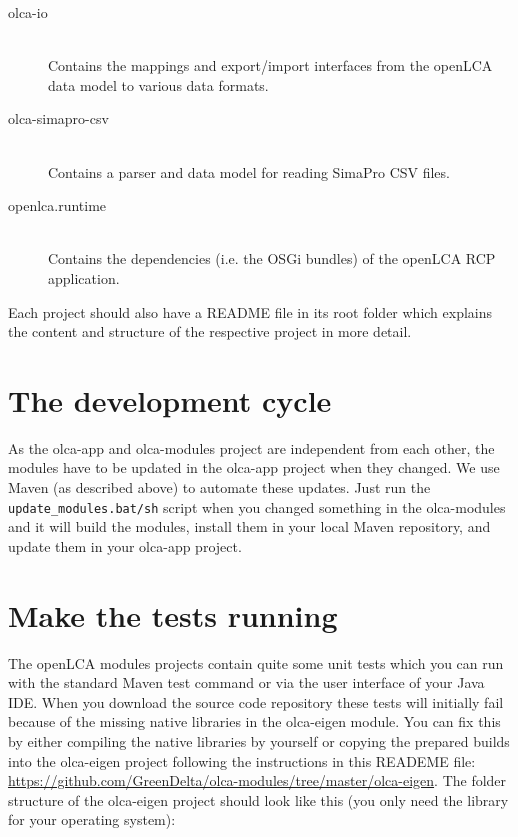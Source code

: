 \documentclass{scrreprt}
\begin{document}
\begin{description}
  \item[olca-io] \hfill \\
  Contains the mappings and export/import interfaces from the openLCA data model to various data formats.
  
  \item[olca-simapro-csv] \hfill \\
  Contains a parser and data model for reading SimaPro CSV files.
  
  \item[openlca.runtime] \hfill \\
  Contains the dependencies (i.e. the OSGi bundles) of the openLCA RCP application.
  
\end{description}

Each project should also have a README file in its root folder which explains the content and structure of the respective project in more detail.

\section{The development cycle}
As the olca-app and olca-modules project are independent from each other, the modules have to be updated in the olca-app project when they changed. We use Maven (as described above) to automate these updates. Just run the \texttt{update\_modules.bat/sh} script when you changed something in the olca-modules and it will build the modules, install them in your local Maven repository, and update them in your olca-app project. 

\section{Make the tests running}
The openLCA modules projects contain quite some unit tests which you can run with the standard Maven test command or via the user interface of your Java IDE. When you download the source code repository these tests will initially fail because of the missing native libraries in the olca-eigen module. You can fix this by either compiling the native libraries by yourself or copying the prepared builds into the olca-eigen project following the instructions in this READEME file: \url{https://github.com/GreenDelta/olca-modules/tree/master/olca-eigen}. The folder structure of the olca-eigen project should look like this (you only need the library for your operating system):
\end{document}
